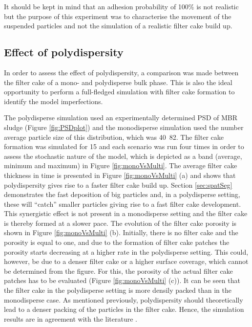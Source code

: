 It should be kept in mind that an adhesion probability of 100\% is not realistic but the purpose of this experiment was to characterise the movement of the suspended particles and not the simulation of a realistic filter cake build up.
\subsection{Effect of polydispersity \label{sec:multidispresult}}
In order to assess the effect of polydispersity, a comparison was made between the filter cake of a mono- and polydisperse bulk phase. This is also the ideal opportunity to perform a full-fledged simulation with filter cake formation to identify the model imperfections. \par 
The polydisperse simulation used an experimentally determined \gls{PSD} of \gls{MBR} sludge (Figure \ref{fig:PSDplot}) and the monodisperse simulation used the number average particle size of this distribution, which was \unit{40.82}{\micro\metre}.  The filter cake formation was simulated for \unit{15}{\second} and each scenario was run four times in order to assess the stochastic nature of the model, which is depicted as a band (average, minimum and maximum) in Figure \ref{fig:monoVsMulti}. 
The average filter cake thickness in time is presented in Figure \ref{fig:monoVsMulti} (a) and shows that polydispersity gives rise to a faster filter cake build up. Section \ref{sec:spatSeg} demonstrates the fast deposition of big particles and, in a polydisperse setting, these will ``catch'' smaller particles giving rise to a fast filter cake development. This synergistic effect is not present in a monodisperse setting and the filter cake is thereby formed at a slower pace. The evolution of the filter cake porosity is shown in Figure \ref{fig:monoVsMulti} (b). Initially, there is no filter cake and the porosity is equal to one, and due to the formation of filter cake patches the porosity starts decreasing at a higher rate in the polydisperse setting. This could, however, be due to a denser filter cake or a higher surface coverage, which cannot be determined from the figure. For this, the porosity of the actual filter cake patches has to be evaluated (Figure \ref{fig:monoVsMulti} (c)). It can be seen that the filter cake in the polydisperse setting is more densily packed than in the monodisperse case. As mentioned previously, polydispersity should theoretically lead to a denser packing of the particles in the filter cake. Hence, the simulation results are in agreement with the literature \citep{Desmond2013,partPack2}. \par
